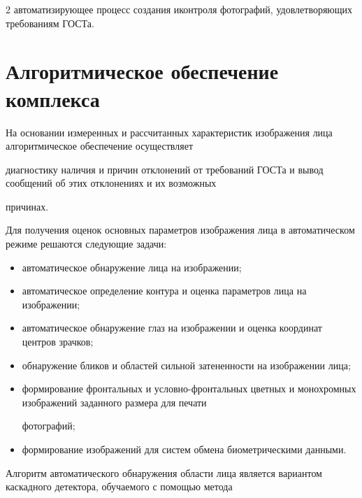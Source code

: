 \begin{multicols}{2}
автоматизирующее процесс создания и\linebreak контроля фотографий, удовлетворяющих требованиям \mbox{ГОСТа}.





\section{Алгоритмическое обеспечение комплекса}





На основании измеренных и рассчитанных характеристик изображения лица алгоритмическое обеспечение осуществляет 


диагностику наличия и причин отклонений от требований ГОСТа и вывод сообщений об этих отклонениях и их возможных 


причинах.





Для получения оценок основных параметров изображения лица в автоматическом режиме решаются следующие задачи:


\begin{itemize}


\item автоматическое обнаружение лица на изображении;


\item автоматическое определение контура и оценка параметров лица на изображении;


\item автоматическое обнаружение глаз на изображении и оценка координат центров зрачков;


\item обнаружение бликов и областей сильной затененности на изображении лица;


\item формирование фронтальных и условно-фрон\-таль\-ных цветных и монохромных изображений заданного размера для печати 


фотографий;


\item формирование изображений для систем обмена биометрическими данными.


\end{itemize}





Алгоритм автоматического обнаружения об\-ласти лица является вариантом каскадного детектора, обучаемого с помощью метода 



\end{multicols}
